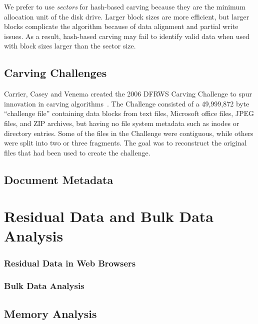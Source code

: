 \documentclass[11pt,letter]{article}
\begin{document}
We prefer to use \emph{sectors} for hash-based
carving because they are the minimum allocation unit of the disk
drive. Larger block sizes are more efficient, but larger blocks
complicate the algorithm because of data alignment and partial write
issues. As a result, hash-based carving may fail to identify valid
data when used with block sizes larger than the sector size.


\section{Carving Challenges}

Carrier, Casey and Venema created the 2006 DFRWS Carving Challenge
to spur innovation in carving
algorithms~\cite{dfrws2006-challenge}. The Challenge consisted of a
49,999,872 byte ``challenge file'' containing data blocks from text
files, Microsoft office files, JPEG files, and ZIP 
archives, but having no file system metadata such as inodes or
directory entries. Some of the files in the Challenge were
contiguous, while others were split into two or three fragments. The
goal was to reconstruct the original files
that had been used to create the challenge. 




\section{Document Metadata}
\chapter{Residual Data and Bulk Data Analysis}


\subsection{Residual Data in Web Browsers}
\cite{dfrws2011:JunghoonOhAndSeungbongLeeAndSangjinLee}

\subsection{Bulk Data Analysis}

\cite{dfrws2011:RobertBeverlyAndSimsonGarfinkelAndGregCardwell}
\cite{dfrws2011:RalfBrown}


\section{Memory Analysis}
\cite{dfrws2011:JamesOkolicaAndGilbertPeterson}
 
\end{document}

